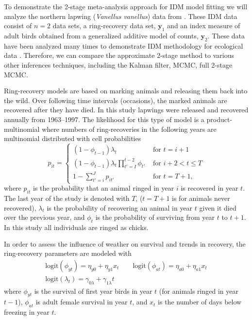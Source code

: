\documentclass[12pt]{article}
\newcommand{\by}{\mathbf{y}}
\begin{document}
To demonstrate the 2-stage meta-analysis approach for IDM model fitting we will analyze the northern lapwing ({\it Vanellus vanellus}) data from \cite{besbeas2002integrating}. These IDM data consist of $n=2$ data sets, a ring-recovery data set, $\by_1$ and an index measure of adult birds obtained from a generalized additive model of counts, $\by_2$. These data have been analyzed many times to demonstrate IDM methodology for ecological data \citep{besbeas2002integrating, Brooks:2004zi, besbeas2019exact, goudie2019joining}. Therefore, we can compare the approximate 2-stage method to various other inferences techniques, including the Kalman filter, MCMC, full 2-stage MCMC. 

Ring-recovery models are based on marking animals and releasing them back into the wild. Over following time intervals (occasions), the marked animals are recovered after they have died. In this study lapwings were released and recovered annually from 1963--1997. The likelihood for this type of model is a product-multinomial where numbers of ring-recoveries in the following years are multinomial distributed with cell probabilities
\[
p_{it} = \left\{ 
\begin{array}{ll}
(1-\phi_{t-1})\lambda_t & \text{ for } t=i+1 \\
(1-\phi_{t-1})\lambda_t\prod_{t'=I}^{t-2} \phi_{t'} & \text{ for } i+2 < t \le T \\
1-\sum_{t'=i}^J p_{it'} & \text{ for } t=T+1,
\end{array} \right.
\]
where $p_{it}$ is the probability that an animal ringed in year $i$ is recovered in year $t$. The last year of the study is denoted with $T$, ($t=T+1$ is for animals never recovered), $\lambda_t$ is the probability of recovering an animal in year $t$ given it died over the previous year, and $\phi_t$ is the probability of surviving from year $t$ to $t+1$. In this study all individuals are ringed as chicks. 

In order to assess the influence of weather on survival and trends in recovery, the ring-recovery parameters are modeled with 
\begin{equation}
\begin{gathered}
\text{logit}(\phi_{yt}) = \eta_{y0} + \eta_{y1} x_t\qquad \text{logit}(\phi_{at}) = \eta_{a0}+ \eta_{a1} x_t\\
\text{logit}(\lambda_t) = \gamma_{0\lambda} + \gamma_{1\lambda} t
\end{gathered}
\end{equation}
where $\phi_{yt}$ is the survival of first year birds in year $t$ (for animals ringed in year $t-1$), $\phi_{at}$ is adult female survival in year $t$, and $x_t$ is the number of days below freezing in year $t$. 
\end{document}

